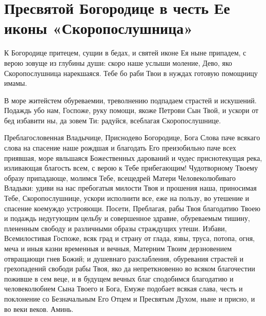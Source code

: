 \section{Пресвятой Богородице в честь Ее иконы «Скоропослушница»}\begin{mymulticols}


К Богородице притецем, сущии в бедах, и святей иконе Ея ныне припадем, с верою зовуще из глубины души: скоро наше услыши моление, Дево, яко Скоропослушница нарекшаяся. Тебе бо раби Твои в нуждах готовую помощницу имамы.


В море житейстем обуреваемии, треволнению подпадаем страстей и искушений. Подаждь убо нам, Госпоже, руку помощи, якоже Петрови Сын Твой, и ускори от бед избавити ны, да зовем Ти: радуйся, всеблагая Скоропослушнице.


Преблагословенная Владычице, Приснодево Богородице, Бога Слова паче всякаго слова на спасение наше рождшая и благодать Его преизобильно паче всех приявшая, море явльшаяся Божественных дарований и чудес приснотекущая река, изливающая благость всем, с верою к Тебе прибегающим! Чудотворному Твоему образу припадающе, молимся Тебе, всещедрей Матери Человеколюбиваго Владыки: удиви на нас пребогатыя милости Твоя и прошения наша, приносимая Тебе, Скоропослушнице, ускори исполнити все, еже на пользу, во утешение и спасение коемуждо устрояющи. Посети, Преблагая, рабы Твоя благодатию Твоею и подаждь недугующим цельбу и совершенное здравие, обуреваемым тишину, плененным свободу и различными образы страждущих утеши. Избави, Всемилостивая Госпоже, всяк град и страну от глада, язвы, труса, потопа, огня, меча и иныя казни временныя и вечныя, Матерним Твоим дерзновением отвращающи гнев Божий; и душевнаго разслабления, обуревания страстей и грехопадений свободи рабы Твоя, яко да непреткновенно во всяком благочестии поживше в сем веце, и в будущем вечных благ сподобимся благодатию и человеколюбием Сына Твоего и Бога, Емуже подобает всякая слава, честь и поклонение со Безначальным Его Отцем и Пресвятым Духом, ныне и присно, и во веки веков. Аминь.

\end{mymulticols}

